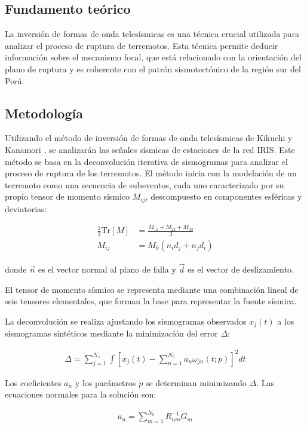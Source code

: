 \documentclass[a4paper,11pt]{article}
\begin{document}
\subsection{Fundamento teórico}

La inversión de formas de onda telesísmicas es una técnica crucial utilizada para analizar el proceso de ruptura de terremotos. Esta técnica permite deducir información sobre el mecanismo focal, que está relacionado con la orientación del plano de ruptura y es coherente con el patrón sismotectónico de la región sur del Perú.

\subsection{Metodología}
Utilizando el método de inversión de formas de onda telesísmicas de Kikuchi y Kanamori \cite{Kik2003}, se analizarán las señales sísmicas de estaciones de la red IRIS. Este método se basa en la deconvolución iterativa de sismogramas para analizar el proceso de ruptura de los terremotos. El método inicia con la modelación de un terremoto como una secuencia de subeventos, cada uno caracterizado por su propio tensor de momento sísmico \( M_{ij} \), descompuesto en componentes esféricas y deviatorias:

\begin{align}
  \frac{1}{3} \text{Tr}[M] & = \frac{M_{11} + M_{22} + M_{33}}{3}\\
  M_{ij} &= M_0(n_i d_j + n_j d_i)
\end{align}

donde \( \vec{n} \) es el vector normal al plano de falla y \( \vec{d} \) es el vector de deslizamiento.

El tensor de momento sísmico se representa mediante una combinación lineal de seis tensores elementales, que forman la base para representar la fuente sísmica.

La deconvolución se realiza ajustando los sismogramas observados \( x_j(t) \) a los sismogramas sintéticos mediante la minimización del error \( \Delta \):

\begin{align}
    \Delta = \sum_{j=1}^{N_s} \int \left[ x_j(t) - \sum_{n=1}^{N_b} a_n \omega_{jn}(t; p) \right]^2 dt
\end{align}

Los coeficientes \( a_n \) y los parámetros \( p \) se determinan minimizando \( \Delta \). Las ecuaciones normales para la solución son:

\begin{align}
    a_n = \sum_{m=1}^{N_b} R_{nm}^{-1} G_m
\end{align}
\end{document}
